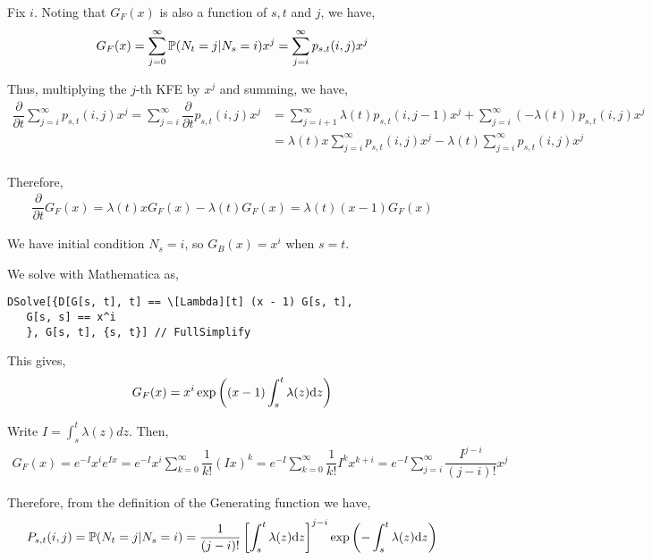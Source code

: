 \documentclass[10pt]{article}
\begin{document}
\begin{solution}[Solution]
Fix \( i \). Noting that \( G_F(x) \) is also a function of \( s,t \) and \( j \), we have,
\begin{align*}
    G_F(x) = \sum_{j=0}^{\infty} \mathbb{P}(N_t = j | N_s = i) x^{j} = \sum_{j=i}^{\infty}p_{s,t}(i,j) x^{j} 
\end{align*}

Thus, multiplying the \( j \)-th KFE by \( x^j \) and summing, we have,
\begin{align*}
    \dfrac{\partial}{\partial t} \sum_{j=i}^{\infty} p_{s,t}(i,j)x^{j}
    =\sum_{j=i}^{\infty} \dfrac{\partial}{\partial t} p_{s,t}(i,j)x^j 
    &= \sum_{j=i+1}^{\infty} \lambda(t) p_{s,t}(i,j-1) x^{j} + \sum_{j=i}^{\infty} (-\lambda(t)) p_{s,t}(i,j) x^j \\
    &= \lambda(t) x\sum_{j=i}^{\infty} p_{s,t}(i,j) x^{j} -\lambda(t) \sum_{j=i}^{\infty} p_{s,t}(i,j) x^j \\
\end{align*}

Therefore,
\begin{align*}
    \dfrac{\partial}{\partial t} G_{F}(x) 
    = \lambda(t) x G_{F}(x) - \lambda(t) G_{F}(x) 
    = \lambda(t) (x-1)G_{F}(x)
\end{align*}

We have initial condition \( N_s = i \), so \( G_B(x) = x^i \) when \( s=t \). 

We solve with Mathematica as,
\begin{lstlisting}
DSolve[{D[G[s, t], t] == \[Lambda][t] (x - 1) G[s, t],
   G[s, s] == x^i
   }, G[s, t], {s, t}] // FullSimplify
\end{lstlisting}

This gives,
\begin{align*}
    G_F(x) = x^i\exp \left( (x-1) \int_{s}^{t}\lambda(z)\mathrm{d} z \right)
\end{align*}

Write \( I = \int_{s}^{t}\lambda(z)dz \). Then,
\begin{align*}
    G_F(x) = e^{-I} x^i e^{Ix} = e^{-I} x^i \sum_{k=0}^{\infty} \dfrac{1}{k!}(Ix)^k 
    = e^{-I} \sum_{k=0}^{\infty}\dfrac{1}{k!}I^kx^{k+i} 
    = e^{-I} \sum_{j=i}^{\infty} \dfrac{I^{j-i}}{(j-i)!}x^{j}
\end{align*}

Therefore, from the definition of the Generating function we have,
\begin{align*}
    P_{s,t}(i,j) 
    = \mathbb{P}(N_t=j | N_s = i) 
    =  \dfrac{1}{(j-i)!} \left[ \int_{s}^{t}\lambda(z)\mathrm{d} z \right]^{j-i}\exp \left( -\int_{s}^{t} \lambda(z)\mathrm{d} z \right)
\end{align*}




\end{solution}
\end{document}
